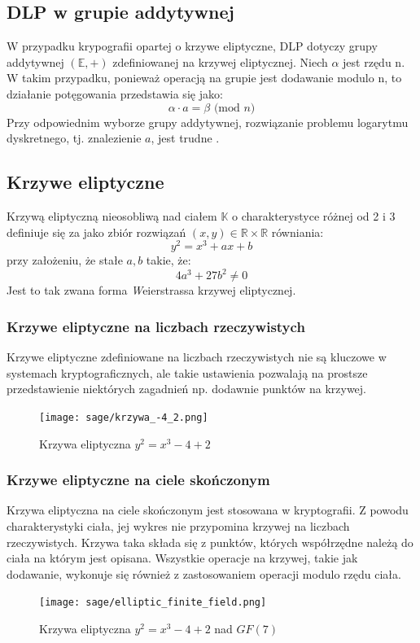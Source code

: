 \subsection{DLP w grupie addytywnej}
W przypadku krypografii opartej o krzywe eliptyczne, DLP dotyczy
grupy addytywnej $(\mathbb{E},+)$ zdefiniowanej na krzywej eliptycznej.
Niech $\alpha$ jest rzędu n.
W takim przypadku, ponieważ operacją na grupie jest dodawanie modulo n, to działanie
potęgowania przedstawia się jako:
\[\alpha \cdot a = \beta \textrm{ (mod } n)\]
Przy odpowiednim wyborze grupy addytywnej, rozwiązanie problemu logarytmu dyskretnego,
tj. znalezienie $a$,
jest trudne \cite{chrzaszczyk2010}\cite{stinson21}.
\subsection{Krzywe eliptyczne}
Krzywą eliptyczną nieosobliwą nad ciałem $\mathbb{K}$ o charakterystyce różnej od 2 i 3 definiuje się
za jako zbiór rozwiązań $(x,y) \in \mathbb{R} \times \mathbb{R}$ równiania: \cite*{stinson21}
\[y^2 = x^3 + ax + b\]
przy założeniu, że stałe $a, b$ takie, że:
\[4a^3 + 27b^2 \not= 0\]
Jest to tak zwana forma {\textit Weierstrassa} krzywej eliptycznej.
% 
\subsubsection{Krzywe eliptyczne na liczbach rzeczywistych}
% 
Krzywe eliptyczne zdefiniowane na liczbach rzeczywistych nie są kluczowe w
systemach kryptograficznych\cite*{chrzaszczyk2010}\cite*{stinson21}, ale takie ustawienia
pozwalają na prostsze przedstawienie niektórych zagadnień
np. dodawnie punktów na krzywej.
\begin{figure}[!h]
    \centering \texttt{[image: sage/krzywa\_-4\_2.png]}
    \caption{Krzywa eliptyczna $y^2=x^3-4+2$}
\end{figure}
% 
\subsubsection*{Krzywe eliptyczne na ciele skończonym}
Krzywa eliptyczna na ciele skończonym jest stosowana w kryptografii.
Z powodu charakterystyki ciała, jej wykres
nie przypomina krzywej na liczbach rzeczywistych.
Krzywa taka składa się z punktów, których współrzędne należą do ciała
na którym jest opisana.
Wszystkie operacje na krzywej, takie jak dodawanie, wykonuje się
również z zastosowaniem operacji modulo rzędu ciała.
\begin{figure}[!h]
    \centering \texttt{[image: sage/elliptic\_finite\_field.png]}
    \caption{Krzywa eliptyczna $y^2=x^3-4+2$ nad $GF(7)$}
\end{figure}
% 
